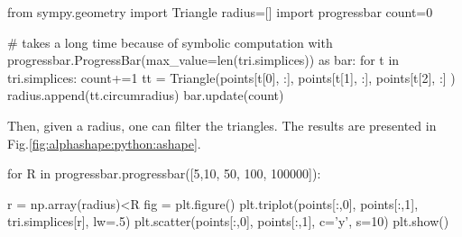 \begin{python}
from sympy.geometry import Triangle
radius=[]
import progressbar
count=0

# takes a long time because of symbolic computation
with progressbar.ProgressBar(max_value=len(tri.simplices)) as bar:
    for t in tri.simplices:
        count+=1
        tt = Triangle(points[t[0], :], points[t[1], :], points[t[2], :] )
        radius.append(tt.circumradius)
        bar.update(count)
\end{python}


Then, given a radius,  one can filter the triangles. The results are presented in Fig.\ref{fig:alphashape:python:ashape}.

\begin{python}
for R in progressbar.progressbar([5,10, 50, 100, 100000]):
    
    r = np.array(radius)<R
    fig = plt.figure()
    plt.triplot(points[:,0], points[:,1], tri.simplices[r], lw=.5)
    plt.scatter(points[:,0], points[:,1], c='y', s=10)
    plt.show()
\end{python}

